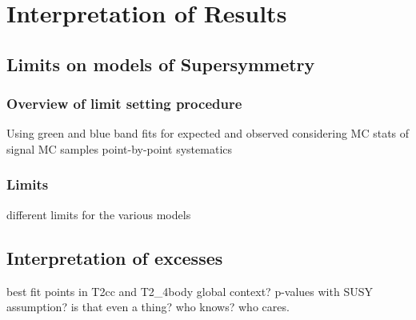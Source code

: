 \chapter{Interpretation of Results}

\ifpdf
    \graphicspath{{Chapter9/Figs/Raster/}{Chapter9/Figs/PDF/}{Chapter9/Figs/}}
\else
    \graphicspath{{Chapter9/Figs/Vector/}{Chapter9/Figs/}}
\fi


\section{Limits on models of Supersymmetry}  %
\label{sec:interpretation_limits}

\subsection{Overview of limit setting procedure}
Using green and blue band fits for expected and observed
considering MC stats of signal MC samples
point-by-point systematics

\subsection{Limits}
different limits for the various models


\section{Interpretation of excesses}
\label{sec:interpretation_excess}
best fit points in T2cc and T2_4body
global context?
p-values with SUSY assumption? is that even a thing? who knows? who cares.